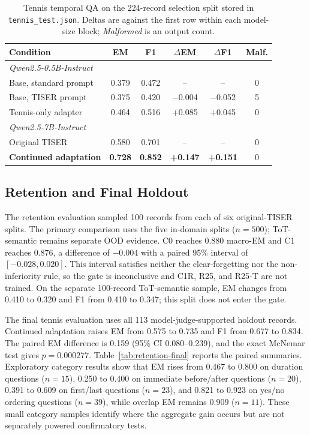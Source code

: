 \documentclass[conference]{IEEEtran}
\begin{document}
\begin{table}[t]
\centering
\caption{Tennis temporal QA on the 224-record selection split stored in \texttt{tennis\_test.json}. Deltas are against the first row within each model-size block; \emph{Malformed} is an output count.}
\label{tab:tennis}
\setlength{\tabcolsep}{3.4pt}
{\footnotesize
\begin{tabular}{lccccc}
\toprule
\textbf{Condition} & \textbf{EM} & \textbf{F1} & \textbf{$\Delta$EM} & \textbf{$\Delta$F1} & \textbf{Malf.} \\
\midrule
\multicolumn{6}{l}{\emph{Qwen2.5-0.5B-Instruct}} \\
Base, standard prompt   & 0.379 & 0.472 & -- & -- & 0 \\
Base, TISER prompt      & 0.375 & 0.420 & $-$0.004 & $-$0.052 & 5 \\
\rowcolor{gray!10}
Tennis-only adapter     & 0.464 & 0.516 & +0.085 & +0.045 & 0 \\
\midrule
\multicolumn{6}{l}{\emph{Qwen2.5-7B-Instruct}} \\
Original TISER & 0.580 & 0.701 & -- & -- & 0 \\
\rowcolor{gray!18}
\textbf{Continued adaptation} & \textbf{0.728} & \textbf{0.852} & \textbf{+0.147} & \textbf{+0.151} & 0 \\
\bottomrule
\end{tabular}
}
\end{table}

\subsection{Retention and Final Holdout}

The retention evaluation sampled 100 records from each of six original-TISER splits. The primary comparison uses the five in-domain splits ($n=500$); ToT-semantic remains separate OOD evidence. C0 reaches 0.880 macro-EM and C1 reaches 0.876, a difference of $-0.004$ with a paired 95\% interval of $[-0.028,0.020]$. This interval satisfies neither the clear-forgetting nor the non-inferiority rule, so the gate is inconclusive and C1R, R25, and R25-T are not trained. On the separate 100-record ToT-semantic sample, EM changes from 0.410 to 0.320 and F1 from 0.410 to 0.347; this split does not enter the gate.

The final tennis evaluation uses all 113 model-judge-supported holdout records. Continued adaptation raises EM from 0.575 to 0.735 and F1 from 0.677 to 0.834. The paired EM difference is 0.159 (95\% CI 0.080--0.239), and the exact McNemar test gives $p=0.000277$. Table~\ref{tab:retention-final} reports the paired summaries. Exploratory category results show that EM rises from 0.467 to 0.800 on duration questions ($n=15$), 0.250 to 0.400 on immediate before/after questions ($n=20$), 0.391 to 0.609 on first/last questions ($n=23$), and 0.821 to 0.923 on yes/no ordering questions ($n=39$), while overlap EM remains 0.909 ($n=11$). These small category samples identify where the aggregate gain occurs but are not separately powered confirmatory tests.
\end{document}
